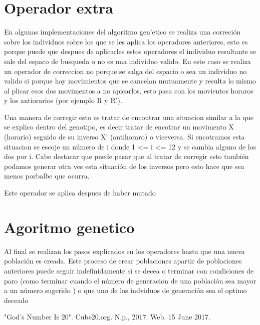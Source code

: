 \documentclass[oneside,10pt]{article}
\begin{document}
\section{Operador extra}
En algunas implementaciones del algoritmo gen'etico se realiza una correci\'on sobre los individuos sobre los que se les aplica los operadores anteriores, esto es porque puede que despues de aplicarles estos operadores el individuo resultante se sale del espaco de busqueda o no es una individuo valido. En este caso se realiza un operador de correccion no porque se salga del espacio o sea un individuo no valido si porque hay movimientos que se cancelan mutuamente y resulta lo mismo al plicar esos dos movimentos a no apicarlos, esto pasa con los movientos horaros y los antiorarios (por ejemplo R y R').

Una manera de corregir esto es tratar de encontrar una situacion similar a la que se explico dentro del genotipo, es decir tratar de encotrar un movimento X (horario) seguido de su inverso X' (antihoraro) o viceversa. Si encotramos esta situacion se escoje un n\'umero de i donde 1 <= i <= 12 y se cambia alguno de los dos por i. Cabe destacar que puede pasar que al tratar de corregir esto tambi\'en podamos generar otra ves esta situaci\'on de los inversos pero esto hace que sea menos porbalbe que ocurra.

Este operador se aplica despues de haber mutado
\section{Agoritmo genetico}
Al final se realizan los pasos explicados en los operadores hasta que una nueva poblaci\'on es creada. Este proceso de crear poblaciones apartir de poblaciones anteriores puede seguir indefinidamente si se decea o terminar con condiciones de paro (como terminar cuando el n\'umero de generacion de una poblaci\'on sea mayor a un n\'umero sugerido ) o que uno de los indviduos de generaci\'on sea el optimo deceado
\begin{thebibliography}{99}
 "God's Number Is 20". Cube20.org. N.p., 2017. Web. 15 June 2017.


\end{thebibliography}
\end{document}
